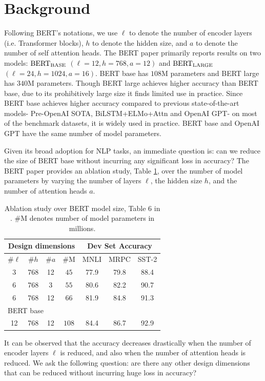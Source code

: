 \documentclass[11pt,a4paper]{article}
\begin{document}
\section{Background}
Following BERT's notations, we use $\ell$ to denote the number of encoder layers (i.e. Transformer blocks), $h$ to denote the hidden size, and $a$ to denote the number of self attention heads. The BERT paper \citep{devlin2018bert} primarily reports results on two models: {$\rm BERT_{BASE}$} $(\ell=12, h = 768, a = 12)$ and {$\rm BERT_{LARGE}$} $(\ell=24, h = 1024, a = 16)$. BERT base has $108$M parameters and BERT large has $340$M parameters. Though BERT large achieves higher accuracy than BERT base, due to its prohibitively large size it finds limited use in practice. Since BERT base achieves higher accuracy compared to previous state-of-the-art models- Pre-OpenAI SOTA, BiLSTM+ELMo+Attn and OpenAI GPT- on most of the benchmark datasets, it is widely used in practice. BERT base and OpenAI GPT have the same number of model parameters. 

Given its broad adoption for NLP tasks, an immediate question is: can we reduce the size of BERT base without incurring any significant loss in accuracy? The BERT paper \citep{devlin2018bert} provides an ablation study, Table \ref{tab:bert_ablation}, over the number of model parameters by varying the number of layers $\ell$, the hidden size $h$, and the number of attention heads $a$. 
\begin{table}
\begin{center}
\begin{tabular}{ccccccc}
\hline
\multicolumn{4}{c}{Design dimensions} & \multicolumn{3}{c}{Dev Set Accuracy}\\
\hline
$\#\ell$ & $\#h$ & $\#a$ & $\#$M &  MNLI & MRPC & SST-2\\
3 & 768 & 12 & $45$ & 77.9 & 79.8 & 88.4 \\
6 & 768 & 3 &  $55$ & 80.6 & 82.2 & 90.7 \\
6 & 768 & 12 & $66$ & 81.9 & 84.8 & 91.3 \\
\multicolumn{7}{l}{BERT base}\\
12 & 768 & 12 & $108$ & 84.4 & 86.7 & 92.9\\
\hline
\end{tabular}
\end{center}
\caption{\label{tab:bert_ablation} Ablation study over BERT model size, Table $6$ in \citet{devlin2018bert}. $\#$M denotes number of model parameters in millions.}
\end{table}
It can be observed that the accuracy decreases drastically when the number of encoder layers $\ell$ is reduced, and also when the number of attention heads is reduced. We ask the following question: are there any other design dimensions that can be reduced without incurring huge loss in accuracy?
\end{document}

